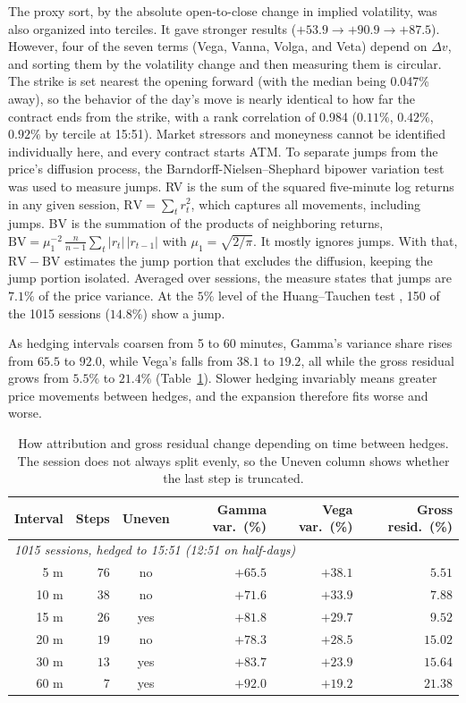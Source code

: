 \documentclass[11pt]{article}
\begin{document}
The proxy sort, by the absolute open-to-close change in implied volatility, was also organized into terciles.
It gave stronger results ($+53.9 \to +90.9 \to +87.5$).
However, four of the seven terms (Vega, Vanna, Volga, and Veta) depend on $\Delta v$, and sorting them by the volatility change and then measuring them is circular.
The strike is set nearest the opening forward (with the median being 0.047\% away), so the behavior of the day's move is nearly identical to how far the contract ends from the strike, with a rank correlation of 0.984 ($0.11\%$, $0.42\%$, $0.92\%$ by tercile at 15:51). Market stressors and moneyness cannot be identified individually here, and every contract starts ATM.
To separate jumps from the price's diffusion process, the Barndorff-Nielsen--Shephard bipower variation test \cite{bnsjump2006} was used to measure jumps. RV is the sum of the squared five-minute log returns in any given session, $\mathrm{RV} = \sum_t r_t^2$, which captures all movements, including jumps. BV is the summation of the products of neighboring returns, $\mathrm{BV} = \mu_1^{-2}\,\tfrac{n}{n-1}\sum_t |r_t|\,|r_{t-1}|$ with $\mu_1 = \sqrt{2/\pi}$. It mostly ignores jumps. With that, $\mathrm{RV} - \mathrm{BV}$ estimates the jump portion that excludes the diffusion, keeping the jump portion isolated. Averaged over sessions, the measure states that jumps are $7.1\%$ of the price variance. At the $5\%$ level of the Huang--Tauchen test \cite{huangtauchen2005}, 150 of the 1015 sessions ($14.8\%$) show a jump.

As hedging intervals coarsen from 5 to 60 minutes, Gamma's variance share rises from $65.5$ to $92.0$, while Vega's falls from $38.1$ to $19.2$, all while the gross residual grows from $5.5\%$ to $21.4\%$ (Table~\ref{tab:freq}). Slower hedging invariably means greater price movements between hedges, and the expansion therefore fits worse and worse.

\begin{table}[tbp]
\centering
\footnotesize
\setlength{\tabcolsep}{4pt}
\begin{tabular}{rrcrrr}
\toprule
Interval & Steps & Uneven & Gamma var.\ (\%) & Vega var.\ (\%) & Gross resid.\ (\%) \\
\midrule
\multicolumn{6}{l}{\emph{1015 sessions, hedged to 15:51 (12:51 on half-days)}} \\
5 m  & $76$ & no  & $+65.5$ & $+38.1$ & $5.51$ \\
10 m & $38$ & no  & $+71.6$ & $+33.9$ & $7.88$ \\
15 m & $26$ & yes & $+81.8$ & $+29.7$ & $9.52$ \\
20 m & $19$ & no  & $+78.3$ & $+28.5$ & $15.02$ \\
30 m & $13$ & yes & $+83.7$ & $+23.9$ & $15.64$ \\
60 m & $7$ & yes & $+92.0$ & $+19.2$ & $21.38$ \\
\bottomrule
\end{tabular}
\caption{How attribution and gross residual change depending on time between hedges. The session does not always split evenly, so the Uneven column shows whether the last step is truncated.}

\label{tab:freq}
\end{table}
\end{document}
